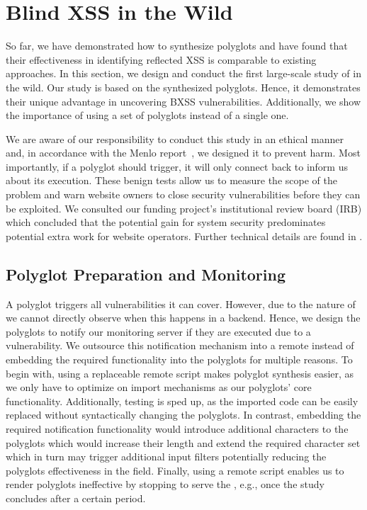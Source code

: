 %
\section{Blind XSS in the Wild}\label{sec:bxss-study}

So far, we have demonstrated how to synthesize polyglots and have found that their effectiveness in identifying reflected XSS is comparable to existing approaches.
In this section, we design and conduct the first large-scale study of \blindxss{} in the wild.
Our study is based on the synthesized polyglots.
Hence, it demonstrates their unique advantage in uncovering BXSS vulnerabilities.
Additionally, we show the importance of using a set of polyglots instead of a single one.


We are aware of our responsibility to conduct this study in an ethical manner and, in accordance with the Menlo report~\cite{KenDit12}, we designed it to prevent harm.
Most importantly, if a polyglot should trigger, it will only connect back to inform us about its execution.
These benign tests allow us to measure the scope of the problem and warn website owners to close security vulnerabilities before they can be exploited.
We consulted our funding project's institutional review board (IRB) which concluded that the potential gain for system security predominates potential extra work for website operators.
Further technical details are found in . %

\subsection{Polyglot Preparation and Monitoring}\label{sec:monitoring-notification}
A polyglot triggers all vulnerabilities it can cover.
However, due to the nature of \blindxss{} we cannot directly observe when this happens in a backend.
Hence, we design the polyglots to notify our monitoring server if they are executed due to a vulnerability.
We outsource this notification mechanism into a remote \emph{\ourscriptname{}} instead of embedding the required functionality into the polyglots for multiple reasons.
To begin with, using a replaceable remote script makes polyglot synthesis easier, as we only have to optimize on import mechanisms as our polyglots' core functionality.
Additionally, testing is sped up, as the imported code can be easily replaced without syntactically changing the polyglots. 
In contrast, embedding the required notification functionality would introduce additional characters to the polyglots which would increase their length and extend the required character set which in turn may trigger additional input filters potentially reducing the polyglots effectiveness in the field.
Finally, using a remote script enables us to render polyglots ineffective by stopping to serve the \ourscriptname{}, e.g., once the study concludes after a certain period. %

